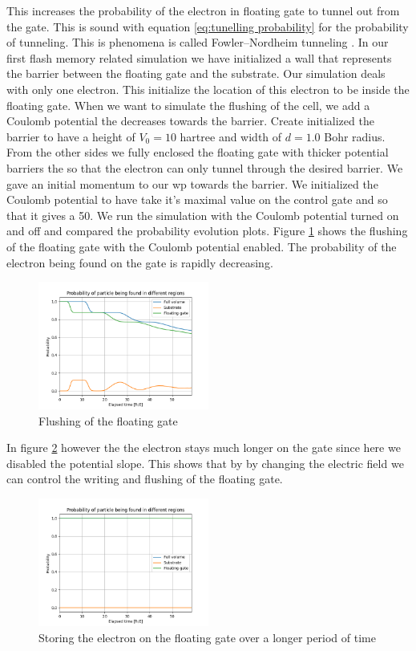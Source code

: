 This increases the probability of the electron in floating gate to tunnel out from the gate. This is sound with equation \ref{eq:tunelling probability} for the probability of tunneling.
This is phenomena is called Fowler–Nordheim tunneling \cite{Fowler_1928bv}.
In our first flash memory related simulation we have initialized a wall that represents the barrier between the floating gate and the substrate.
Our simulation deals with only one electron.
This initialize the location of this electron to be inside the floating gate.
When we want to simulate the flushing of the cell, we add a Coulomb potential the decreases towards the barrier.
Create initialized the barrier to have a height of $V_0 = 10$ hartree and width of $d = 1.0$ Bohr radius.
From the other sides we fully enclosed the floating gate with thicker potential barriers the so that the electron can only tunnel through the desired barrier.
We gave an initial momentum to our \acrshort{wp} towards the barrier.
We initialized the Coulomb potential to have take it's maximal value on the control gate and so that it gives a 50.
We run the simulation with the Coulomb potential turned on and off and compared the probability evolution plots.
Figure \ref{fig:flash_flush_plot} shows the flushing of the floating gate with the Coulomb potential enabled.
The probability of the electron being found on the gate is rapidly decreasing.
\begin{figure}
	\centering
	\includegraphics[width=0.5\textwidth]{figures/flash_flush.png}
	\caption{Flushing of the floating gate}
	\label{fig:flash_flush_plot}
\end{figure}
In figure \ref{fig:flash_keep} however the the electron stays much longer on the gate since here we disabled the potential slope.
This shows that by by changing the electric field we can control the writing and flushing of the floating gate.
\begin{figure}
	\centering
	\includegraphics[width=0.5\textwidth]{figures/flash_keep.png}
	\caption{Storing the electron on the floating gate over a longer period of time}
	\label{fig:flash_keep}
\end{figure}






